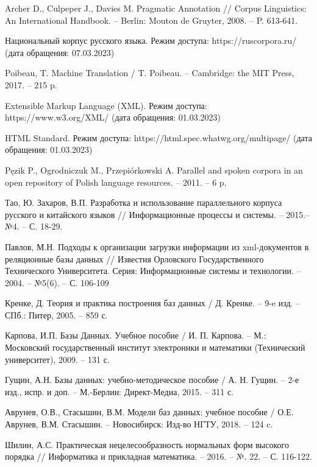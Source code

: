 \begin{thebibliography}{}
	Archer D., Culpeper J., Davies M. Pragmatic Annotation // Corpus Linguistics: An International Handbook. -- Berlin: Mouton de Gruyter, 2008. -- P. 613-641. 
	
	Национальный корпус русского языка. Режим доступа: https://ruscorpora.ru/ (дата обращения: 07.03.2023)
	
	Poibeau, T. Machine Translation / T. Poibeau. -- Cambridge: the MIT Press, 2017. -- 215 p.
	
	Extensible Markup Language (XML). Режим доступа: https://www.w3.org/XML/ (дата обращения: 01.03.2023)
	
	HTML Standard. Режим доступа: https://html.spec.whatwg.org/multipage/ (дата обращения: 01.03.2023)
	
	Pęzik P., Ogrodniczuk M., Przepiórkowski A. Parallel and spoken corpora in an open repository of Polish language resources. -- 2011. -- 6 p.
	
	Тао, Ю. Захаров, В.П. Разработка и использование параллельного корпуса
	русского и китайского языков // Информационные процессы и системы. -- 2015.-- №4. -- С. 18-29.
	
	Павлов, М.Н. Подходы к организации загрузки информации из xml-документов в реляционные базы данных // Известия Орловского Государственного Технического Университета. Серия: Информационные системы и технологии. -- 2004. -- №5(6). -- С. 106-109
	
	Кренке, Д. Теория и практика построения баз данных / Д. Кренке. -- 9-e изд. -- СПб.: Питер, 2005. -- 859 с.
	
	Карпова, И.П. Базы Данных. Учебное пособие / И. П. Карпова. -- М.: Московский государственный институт электроники и математики (Технический университет), 2009. -- 131 с.
	
	Гущин, А.Н. Базы данных: учебно-методическое пособие / А. Н. Гущин. -- 2-е изд., испр. и доп. -- М.-Берлин: Директ-Медиа, 2015. -- 311 с.
	
	Аврунев, О.В., Стасышин, В.М. Модели баз данных: учебное пособие / О.Е. Аврунев, В.М. Стасышин. -- Новосибирск: Изд-во НГТУ, 2018. -- 124 c.
	
	Шилин, А.С. Практическая нецелесообразность нормальных форм высокого порядка // Информатика и прикладная математика. -- 2016. -- №. 22. -- С. 116-122.
	

\end{thebibliography}
